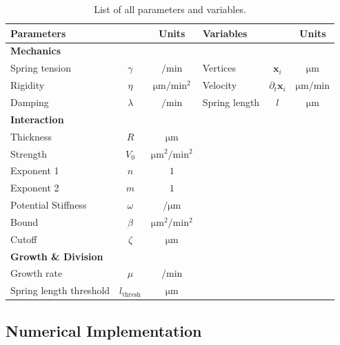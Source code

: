\documentclass[10pt,letterpaper]{article}
\renewcommand{\vec}[1]{\mathbf{#1}}
\begin{document}
\begin{table}[H]
    \centering
    \def\arraystretch{1.3}
    \begin{tabular}{l c c l c c}
        \textbf{Parameters} && \textbf{Units} & \textbf{Variables} && \textbf{Units}\\
        \toprule
        \multicolumn{4}{l}{\textbf{Mechanics}}\\
        \midrule
        Spring tension & $\gamma$ & $\unit{\per\minute}$ & Vertices & $\vec{x}_i$ & $\unit{\micro\metre}$\\
        Rigidity & $\eta$ & $\unit{\micro\metre\per\minute^2}$ & Velocity & $\partial_t\vec{x}_i$ & $\unit{\micro\metre\per\minute}$\\
        Damping & $\lambda$ & $\unit{\per\minute}$ & Spring length & $l$ & $\unit{\micro\metre}$\\
        \multicolumn{4}{l}{\textbf{Interaction}}\\
        \midrule
        Thickness & $R$ & $\unit{\micro\metre}$\\
        Strength & $V_0$ & $\unit{\micro\metre^2\per\minute^2}$\\
        Exponent 1 & $n$ & $1$\\
        Exponent 2 & $m$ & $1$\\
        Potential Stiffness & $\omega$ & $\unit{\per\micro\metre}$\\
        Bound & $\beta$ & $\unit{\micro\metre^2\per\minute^2}$\\
        Cutoff & $\zeta$ & $\unit{\micro\metre}$\\
        \multicolumn{4}{l}{\textbf{Growth \& Division}}\\
        \midrule
        Growth rate & $\mu$ &$\unit{\per\minute}$\\
        Spring length threshold & $l_\text{thresh}$ &$\unit{\micro\metre}$\\
        \bottomrule
    \end{tabular}
    \caption{
        List of all parameters and variables.
    }
    \label{table:list-of-parameters}
\end{table}

\subsection{Numerical Implementation}
\end{document}
